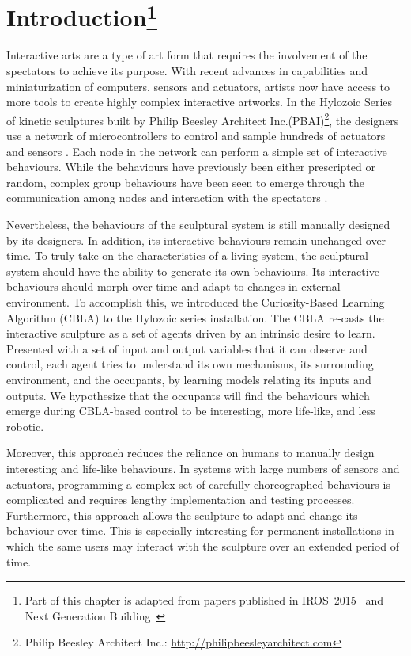 


\chapter[Introduction]{Introduction\footnote{Part of this chapter is adapted from papers published in IROS~2015~\cite{Chan2015} and Next Generation \mbox{Building}~\cite{Gorbet2015}}} 
\label{chap:intro}

Interactive arts are a type of art form that requires the involvement of the spectators to achieve its purpose. With recent advances in capabilities and miniaturization of computers, sensors and actuators, artists now have access to more tools to create highly complex interactive artworks. In the Hylozoic Series of kinetic sculptures built by Philip Beesley Architect Inc.(PBAI)\footnote{Philip Beesley Architect Inc.: \url{http://philipbeesleyarchitect.com}}, the designers use a network of microcontrollers to control and sample hundreds of actuators and sensors \cite{Beesley2010}\cite{Beesley2010-1}. Each node in the network can perform a simple set of interactive behaviours. While the behaviours have previously been either prescripted or random, complex group behaviours have been seen to emerge through the communication among nodes and interaction with the spectators \cite{Beesley2012}. 

Nevertheless, the behaviours of the sculptural system is still manually designed by its designers. In addition, its interactive behaviours remain unchanged over time. To truly take on the characteristics of a living system, the sculptural system should have the ability to generate its own behaviours. Its interactive behaviours should morph over time and adapt to changes in external environment. To accomplish this, we introduced the Curiosity-Based Learning Algorithm (CBLA) to the Hylozoic series installation. The CBLA re-casts the interactive sculpture as a set of agents driven by an intrinsic desire to learn. Presented with a set of input and output variables that it can observe and control, each agent tries to understand its own mechanisms, its surrounding environment, and the occupants, by learning models relating its inputs and outputs. We hypothesize that the occupants will find the behaviours which emerge during CBLA-based control to be interesting, more life-like, and less robotic. 

Moreover, this approach reduces the reliance on humans to manually design interesting and life-like behaviours. In systems with large numbers of sensors and actuators, programming a complex set of carefully choreographed behaviours is complicated and requires lengthy implementation and testing processes. Furthermore, this approach allows the sculpture to adapt and change its behaviour over time. This is especially interesting for permanent installations in which the same users may interact with the sculpture over an extended period of time. 

